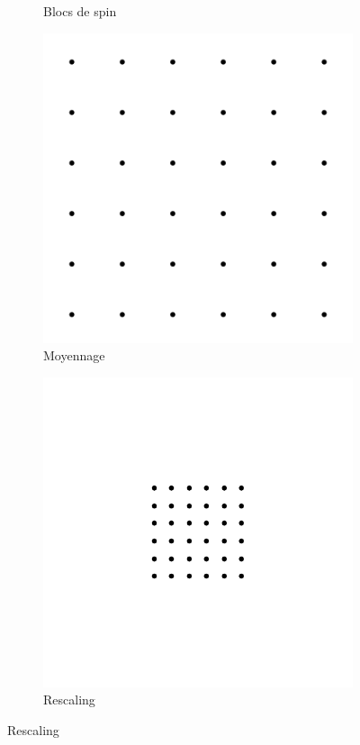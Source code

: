 \documentclass[xcolor=dvipsnames]{beamer}
\begin{document}
\begin{frame}
\begin{figure}[htp]
\begin{subfigure}{.25\textwidth}
	\caption{Blocs de spin}
\end{subfigure}%
\begin{subfigure}{.25\textwidth}
	\centering
	\includegraphics[width=.9\linewidth]{img/renorm_step2.pdf}
	\caption{Moyennage}
\end{subfigure}%
\begin{subfigure}{.25\textwidth}
	\centering
	\includegraphics[width=.9\linewidth]{img/renorm_step3.pdf}
	\caption{Rescaling}
\end{subfigure}
\label{fig:renorm_proc}
\end{figure}


\end{frame}
\end{document}
